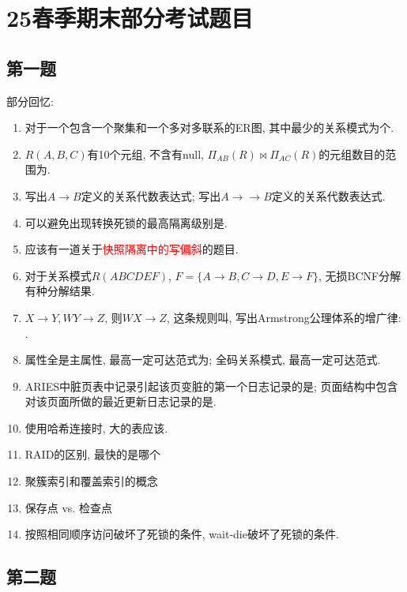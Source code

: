 \section{25春季期末部分考试题目}

\subsection{第一题}

部分回忆:
\begin{enumerate}
    \item 对于一个包含一个聚集和一个多对多联系的ER图, 其中最少的关系模式为\underline{\quad}个.
    \item $R(A,B,C)$有10个元组, 不含有null, $\Pi_{AB}(R) \bowtie \Pi_{AC}(R)$的元组数目的范围为\underline{\quad}.
    \item 写出$A\to B$定义的关系代数表达式\underline{\quad}; 写出$A\to \to B$定义的关系代数表达式.
    \item 可以避免出现转换死锁的最高隔离级别是\underline{\quad}.
    \item 应该有一道关于\textcolor{red}{快照隔离中的写偏斜}的题目.
    \item 对于关系模式$R(ABCDEF)$, $F=\{A\to B,C\to D, E\to F\}$, 无损BCNF分解有\underline{\quad}种分解结果.
    \item $X\to Y, WY\to Z$, 则$WX\to Z$, 这条规则叫\underline{\quad}, 写出Armstrong公理体系的增广律: \underline{\quad}.
    \item 属性全是主属性, 最高一定可达范式为\underline{\quad}; 全码关系模式, 最高一定可达范式.
    \item ARIES中脏页表中记录引起该页变脏的第一个日志记录的是\underline{\quad}; 页面结构中包含对该页面所做的最近更新日志记录的是\underline{\quad}.
    \item 使用哈希连接时, 大的表应该\underline{\quad}.
    \item RAID的区别, 最快的是哪个
    \item 聚簇索引和覆盖索引的概念
    \item 保存点 vs. 检查点
    \item 按照相同顺序访问破坏了死锁的\underline{\quad}条件, wait-die破坏了死锁的\underline{\quad}条件.
\end{enumerate}

\subsection{第二题}


